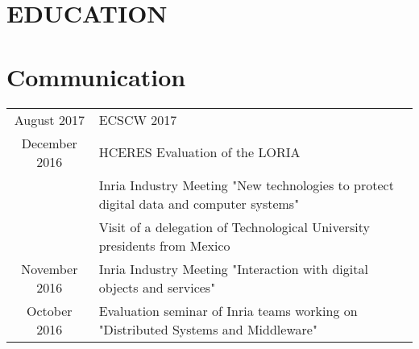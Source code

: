\documentclass[]{deedy-resume-openfont}
\begin{document}
\section{EDUCATION}

\descript{}
\sectionsep


\section{Communication}

\descript{}
\vspace{5pt}
\begin{tabular}{cp{150mm}}
August 2017         & ECSCW 2017\\
December 2016       & HCERES Evaluation of the LORIA\\
                    & Inria Industry Meeting "New technologies to protect digital data and computer systems"\\
                    & Visit of a delegation of Technological University presidents from Mexico\\
November 2016       & Inria Industry Meeting "Interaction with digital objects and services"\\
October 2016        & Evaluation seminar of Inria teams working on "Distributed Systems and Middleware"\\
\end{tabular}
\sectionsep

\hfill
\end{document}
